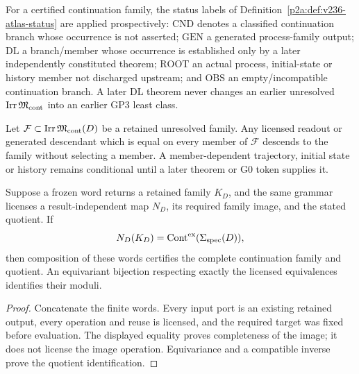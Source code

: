 \documentclass[12pt,a4paper]{article}
\begin{document}
\begin{definition}
\label{p3a:def:v236-dynamics-atlas-status}
For a certified continuation family, the status labels of
Definition~\ref{p2a:def:v236-atlas-status} are applied prospectively:
\(\mathrm{CND}\) denotes a classified continuation branch whose occurrence is
not asserted; \(\mathrm{GEN}\) a generated process-family output;
\(\mathrm{DL}\) a branch/member whose occurrence is established only by a
later independently constituted theorem; \(\mathrm{ROOT}\) an actual process,
initial-state or history member not discharged upstream; and
\(\mathrm{OBS}\) an empty/incompatible continuation branch.  A later
\(\mathrm{DL}\) theorem never changes an earlier unresolved
\(\operatorname{Irr}\mathfrak M_{\rm cont}\) into an earlier GP3 least class.
\end{definition}

\begin{corollary}
\label{p3a:cor:v236-unresolved-common-content}
Let \(\mathcal F\subset\operatorname{Irr}\mathfrak M_{\rm cont}(D)\) be a
retained unresolved family.  Any licensed readout or generated descendant
which is equal on every member of \(\mathcal F\) descends to the family
without selecting a member.  A member-dependent trajectory, initial state or
history remains conditional until a later theorem or G0 token supplies it.
\end{corollary}


\begin{lemma}
\label{p3a:lem:v166-continuation-certificate-transport}
Suppose a frozen word returns a retained family \(K_D\), and the same
grammar licenses a result-independent map \(N_D\), its required family
image, and the stated quotient. If
\[
 N_D(K_D)=\operatorname{Cont}^{\rm ex}(\Sigma_{\rm spec}(D)),
\]
then composition of these words certifies the complete continuation family
and quotient. An equivariant bijection respecting exactly the licensed
equivalences identifies their moduli.
\end{lemma}
\begin{proof}
Concatenate the finite words. Every input port is an existing retained
output, every operation and reuse is licensed, and the required target was
fixed before evaluation. The displayed equality proves completeness of the
image; it does not license the image operation. Equivariance and a compatible
inverse prove the quotient identification.
\end{proof}
\end{document}
